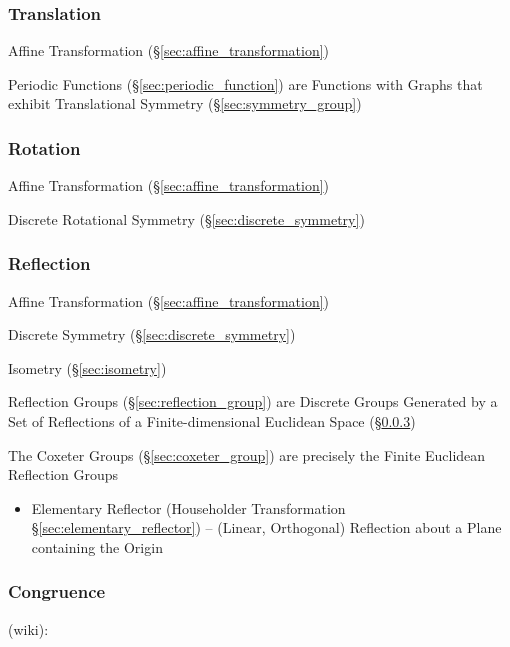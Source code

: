 \subsubsection{Translation}\label{sec:translation}

Affine Transformation (\S\ref{sec:affine_transformation})

\fist Periodic Functions (\S\ref{sec:periodic_function}) are Functions with
Graphs that exhibit Translational Symmetry (\S\ref{sec:symmetry_group})



\subsubsection{Rotation}\label{sec:rotation}

Affine Transformation (\S\ref{sec:affine_transformation})

Discrete Rotational Symmetry (\S\ref{sec:discrete_symmetry})



\subsubsection{Reflection}\label{sec:reflection}

Affine Transformation (\S\ref{sec:affine_transformation})

Discrete Symmetry (\S\ref{sec:discrete_symmetry})

Isometry (\S\ref{sec:isometry})

Reflection Groups (\S\ref{sec:reflection_group}) are Discrete Groups Generated
by a Set of Reflections of a Finite-dimensional Euclidean Space
(\S\ref{sec:reflection})

The Coxeter Groups (\S\ref{sec:coxeter_group}) are precisely the Finite
Euclidean Reflection Groups

\begin{itemize}
  \item Elementary Reflector (Householder Transformation
    \S\ref{sec:elementary_reflector}) -- (Linear, Orthogonal) Reflection about
    a Plane containing the Origin
\end{itemize}



\subsubsection{Congruence}\label{sec:congruence}

(wiki):

